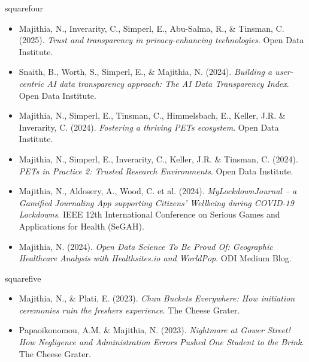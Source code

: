 \documentclass[a4paper,10pt]{article}
\newcommand{\ulinecustom}[1]{%
  \uline{\phantom{#1}}%
  \llap{\contour{white}{#1}}%
}
\begin{document}
\begin{pubbox}[title={PRIVACY, TRUST \& HEALTH}]{squarefour}
\begin{itemize}
    \item Majithia, N., Inverarity, C., Simperl, E., Abu-Salma, R., \& Tinsman, C. (2025). \textit{Trust and transparency in privacy-enhancing technologies}. Open Data Institute. \href{https://theodi.org/insights/reports/trust-and-transparency-in-privacy-enhancing-technologies/}{\ulinecustom{[link]}}
    \item Snaith, B., Worth, S., Simperl, E., \& Majithia, N. (2024). \textit{Building a user-centric AI data transparency approach: The AI Data Transparency Index}. Open Data Institute. \href{https://theodi.org/insights/reports/the-ai-data-transparency-index/}{\ulinecustom{[link]}}
    \item Majithia, N., Simperl, E., Tinsman, C., Himmelsbach, E., Keller, J.R. \& Inverarity, C. (2024). \textit{Fostering a thriving PETs ecosystem}. Open Data Institute. \href{https://theodi.org/insights/reports/fostering-a-thriving-pets-ecosystem/}{\ulinecustom{[link]}}
    \item Majithia, N., Simperl, E., Inverarity, C., Keller, J.R. \& Tinsman, C. (2024). \textit{PETs in Practice 2: Trusted Research Environments}. Open Data Institute. \href{https://theodi.org/insights/explainers/pets-in-practice-2/}{\ulinecustom{[link]}}
    \item Majithia, N., Aldosery, A., Wood, C. et al. (2024). \textit{MyLockdownJournal – a Gamified Journaling App supporting Citizens’ Wellbeing during COVID-19 Lockdowns}. IEEE 12th International Conference on Serious Games and Applications for Health (SeGAH). \href{https://doi.org/10.1109/SeGAH61285.2024.10639532}{\ulinecustom{[link]}}
    \item Majithia, N. (2024). \textit{Open Data Science To Be Proud Of: Geographic Healthcare Analysis with Healthsites.io and WorldPop}. ODI Medium Blog. \href{https://medium.com/odi-research/open-data-science-to-be-proud-of-geographic-healthcare-analysis-with-healthsites-io-and-worldpop-e33ee98d8a81}{\ulinecustom{[link]}}
\end{itemize}
\end{pubbox}

\begin{pubbox}[title={JOURNALISM}, coltitle=squareone]{squarefive}
\begin{itemize}
    \item Majithia, N., \& Plati, E. (2023). \textit{Chun Buckets Everywhere: How initiation ceremonies ruin the freshers experience}. The Cheese Grater. \href{https://cheesegratermagazine.org/article/2022-11-18-chun-buckets-everywhere-how-initiation-ceremonies-ruin-the-freshers-experience}{\ulinecustom{[link]}}
    \item Papaoikonomou, A.M. \& Majithia, N. (2023). \textit{Nightmare at Gower Street! How Negligence and Administration Errors Pushed One Student to the Brink}. The Cheese Grater. \href{https://cheesegratermagazine.org/article/2023-01-18-ucl-admin/}{\ulinecustom{[link]}}
\end{itemize}
\end{pubbox}
\end{document}
